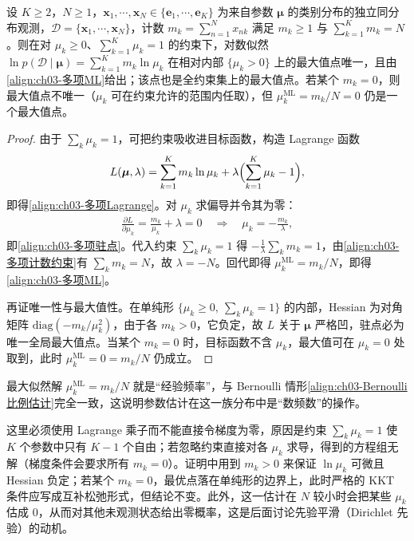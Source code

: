 \documentclass[../../main.tex]{subfiles}
\begin{document}
\begin{proposition}[类别分布的最大似然估计]\label{proposition:ch03-多项最大似然}
设 $K\geqslant2$，$N\geqslant1$，$\boldsymbol{x}_1,\cdots,\boldsymbol{x}_N\in\{\boldsymbol{e}_1,\cdots,\boldsymbol{e}_K\}$ 为来自参数 $\boldsymbol{\mu}$ 的类别分布的独立同分布观测，$\mathcal{D}=\{\boldsymbol{x}_1,\cdots,\boldsymbol{x}_N\}$，计数 $m_k=\sum_{n=1}^{N}x_{nk}$ 满足 $m_k\geqslant1$ 与 $\sum_{k=1}^{K}m_k=N$。则在对 $\mu_k\geqslant0$、$\sum_{k=1}^{K}\mu_k=1$ 的约束下，对数似然 $\ln p(\mathcal{D}\mid\boldsymbol{\mu})=\sum_{k=1}^{K}m_k\ln\mu_k$ 在相对内部 $\{\mu_k>0\}$ 上的最大值点唯一，且由\eqref{align:ch03-多项ML}给出；该点也是全约束集上的最大值点。若某个 $m_k=0$，则最大值点不唯一（$\mu_k$ 可在约束允许的范围内任取），但 $\mu_k^{\mathrm{ML}}=m_k/N=0$ 仍是一个最大值点。
\end{proposition}
\begin{proof}
由于 $\sum_k\mu_k=1$，可把约束吸收进目标函数，构造 Lagrange 函数
\begin{align*}
L(\boldsymbol{\mu},\lambda)=\sum_{k=1}^{K}m_k\ln\mu_k+\lambda\Bigl(\sum_{k=1}^{K}\mu_k-1\Bigr),
\end{align*}
即得\eqref{align:ch03-多项Lagrange}。对 $\mu_k$ 求偏导并令其为零：
\begin{align*}
\frac{\partial L}{\partial\mu_k}=\frac{m_k}{\mu_k}+\lambda=0\quad\Longrightarrow\quad\mu_k=-\frac{m_k}{\lambda},
\end{align*}
即\eqref{align:ch03-多项驻点}。代入约束 $\sum_k\mu_k=1$ 得 $-\frac{1}{\lambda}\sum_k m_k=1$，由\eqref{align:ch03-多项计数约束}有 $\sum_k m_k=N$，故 $\lambda=-N$。回代即得 $\mu_k^{\mathrm{ML}}=m_k/N$，即得\eqref{align:ch03-多项ML}。

再证唯一性与最大值性。在单纯形 $\{\mu_k\geqslant0,\ \sum_k\mu_k=1\}$ 的内部，Hessian 为对角矩阵 $\mathrm{diag}(-m_k/\mu_k^{2})$，由于各 $m_k>0$，它负定，故 $L$ 关于 $\boldsymbol{\mu}$ 严格凹，驻点必为唯一全局最大值点。当某个 $m_k=0$ 时，目标函数不含 $\mu_k$，最大值可在 $\mu_k=0$ 处取到，此时 $\mu_k^{\mathrm{ML}}=0=m_k/N$ 仍成立。
\end{proof}

\begin{remark}
最大似然解 $\mu_k^{\mathrm{ML}}=m_k/N$ 就是“经验频率”，与 Bernoulli 情形\eqref{align:ch03-Bernoulli比例估计}完全一致，这说明参数估计在这一族分布中是“数频数”的操作。

这里必须使用 Lagrange 乘子而不能直接令梯度为零，原因是约束 $\sum_k\mu_k=1$ 使 $K$ 个参数中只有 $K-1$ 个自由；若忽略约束直接对各 $\mu_k$ 求导，得到的方程组无解（梯度条件会要求所有 $m_k=0$）。证明中用到 $m_k>0$ 来保证 $\ln\mu_k$ 可微且 Hessian 负定；若某个 $m_k=0$，最优点落在单纯形的边界上，此时严格的 KKT 条件应写成互补松弛形式，但结论不变。此外，这一估计在 $N$ 较小时会把某些 $\mu_k$ 估成 $0$，从而对其他未观测状态给出零概率，这是后面讨论先验平滑（Dirichlet 先验）的动机。
\end{remark}
\end{document}
